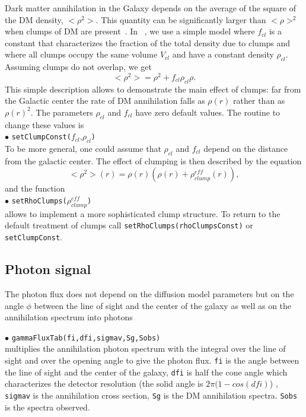 \documentclass[12pt,a4paper]{article}
\begin{document}
Dark matter annihilation in the Galaxy depends on the average of the square of the DM density, $<\rho^2>$. This quantity 
can be significantly larger than $<\rho>^2$ when clumps of DM are present~\cite{Lavalle:2006vb}.  
In \micro~,   we use  a simple model where $f_{cl}$ is a constant 
that characterizes the fraction of the total density due to clumps
 and  where all clumps occupy  the
same volume $V_{cl}$ and have a constant density $\rho_{cl}$. Assuming  clumps do not  overlap, we get 
\begin{equation} 
    <\rho^2> = \rho^2 +  f_{cl}\rho_{cl}\rho .
\end{equation}
This simple description allows to  demonstrate  the main effect of clumps:  far from the Galactic center the rate of DM annihilation falls as $\rho(r)$ rather than as
$\rho(r)^2$. The parameters $\rho_{cl}$  and  $f_{cl}$ have zero default values.  
The routine to change these values is \\
 \noindent $\bullet$ \verb|setClumpConst(|$f_{cl}$,$\rho_{cl}$\verb|)| \\
To be more general, one could assume that $\rho_{cl}$  and  $f_{cl}$  depend on the distance from the galactic center. The effect of clumping  is then described  by the equation 
\begin{equation}
<\rho^2>(r)=\rho(r)(\rho(r) +  \rho_{clump}^{eff}(r)),
\end{equation}
and the function \\
\noindent $\bullet$ \verb|setRhoClumps(|$\rho_{clump}^{eff}$\verb|)|\\
allows to implement a more sophisticated clump  structure. To return to the default  treatment of clumps call
\verb|setRhoClumps(rhoClumpsConst)| or \verb|setClumpConst|.


\subsection{Photon  signal}
The photon  flux does not depend on the  diffusion model parameters but on the angle
$\phi$ between the line of sight and the center of the galaxy as well as on the annihilation spectrum
into photons

\noindent
$\bullet$ \verb|gammaFluxTab(fi,dfi,sigmav,Sg,Sobs)|\\
multiplies the annihilation photon spectrum  with the integral over the line of sight
and over the opening angle to give the photon flux. 
\verb|fi| is the angle between the line of sight and the center of the
galaxy,   \verb|dfi| is half the cone angle which characterizes the detector resolution
(the solid angle is  $2\pi (1-cos(dfi)$) ,  
 \verb|sigmav| is the annihilation cross section, \verb|Sg| is the DM annihilation spectra.
\verb|Sobs| is the spectra observed.
\end{document}
